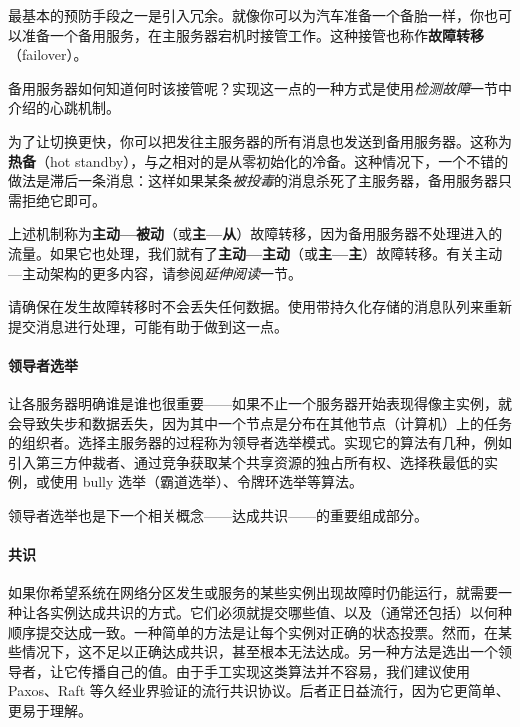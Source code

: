 \label{idx:313}
\label{idx:314}
最基本的预防手段之一是引入冗余。就像你可以为汽车准备一个备胎一样，你也可以准备一个备用服务，在主服务器宕机时接管工作。这种接管也称作\textbf{故障转移}（failover）。

备用服务器如何知道何时该接管呢？实现这一点的一种方式是使用\emph{检测故障}一节中介绍的心跳机制。

\label{idx:315}
\label{idx:316}
为了让切换更快，你可以把发往主服务器的所有消息也发送到备用服务器。这称为\textbf{热备}（hot standby），与之相对的是从零初始化的冷备。这种情况下，一个不错的做法是滞后一条消息：这样如果某条\emph{被投毒}的消息杀死了主服务器，备用服务器只需拒绝它即可。

\label{idx:317}
上述机制称为\textbf{主动—被动}（或\textbf{主—从}）故障转移，因为备用服务器不处理进入的流量。如果它也处理，我们就有了\textbf{主动—主动}（或\textbf{主—主}）故障转移。有关主动—主动架构的更多内容，请参阅\emph{延伸阅读}一节。


\label{idx:318}
请确保在发生故障转移时不会丢失任何数据。使用带持久化存储的消息队列来重新提交消息进行处理，可能有助于做到这一点。

\paragraph{领导者选举}

\label{idx:319}
\label{idx:320}
\label{idx:321}
让各服务器明确谁是谁也很重要——如果不止一个服务器开始表现得像主实例，就会导致失步和数据丢失，因为其中一个节点是分布在其他节点（计算机）上的任务的组织者。选择主服务器的过程称为领导者选举模式。实现它的算法有几种，例如引入第三方仲裁者、通过竞争获取某个共享资源的独占所有权、选择秩最低的实例，或使用 bully 选举（霸道选举）、令牌环选举等算法。


领导者选举也是下一个相关概念——达成共识——的重要组成部分。

\paragraph{共识}

\label{idx:322}
如果你希望系统在网络分区发生或服务的某些实例出现故障时仍能运行，就需要一种让各实例达成共识的方式。它们必须就提交哪些值、以及（通常还包括）以何种顺序提交达成一致。一种简单的方法是让每个实例对正确的状态投票。然而，在某些情况下，这不足以正确达成共识，甚至根本无法达成。另一种方法是选出一个领导者，让它传播自己的值。由于手工实现这类算法并不容易，我们建议使用 Paxos、Raft 等久经业界验证的流行共识协议。后者正日益流行，因为它更简单、更易于理解。

